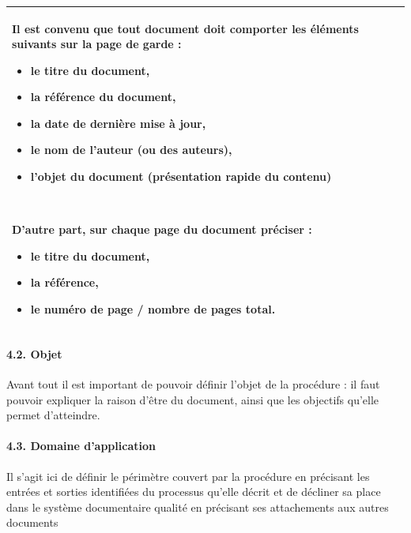\documentclass{article}
\begin{document}
\bigskip

\begin{flushleft}
\tablehead{}
\begin{supertabular}{|m{16.345cm}|}
\hline
Il est convenu que tout document doit comporter les éléments suivants
sur la page de garde :

\begin{itemize}
\item le titre du document,\item la référence du document,\item la date
de dernière mise à jour,\item le nom de l’auteur (ou des auteurs),\item
l’objet du document (présentation rapide du contenu)\end{itemize}
~

D’autre part, sur chaque page du document préciser :

\begin{itemize}
\item le titre du document,\item la référence,\item le numéro de page /
nombre de pages total.\end{itemize}
\\\hline
\end{supertabular}
\end{flushleft}

\bigskip

\paragraph[4.2. Objet]{4.2. Objet}

\bigskip

Avant tout il est important de pouvoir définir l’objet de la procédure :
il faut pouvoir expliquer la raison d’être du document, ainsi que les
objectifs qu’elle permet d’atteindre.


\bigskip

\paragraph[4.3. Domaine d’application]{4.3. Domaine d’application}

\bigskip

Il s’agit ici de définir le périmètre couvert par la procédure en
précisant les entrées et sorties identifiées du processus qu’elle
décrit et de décliner sa place dans le système documentaire qualité en
précisant ses attachements aux autres documents
\end{document}
